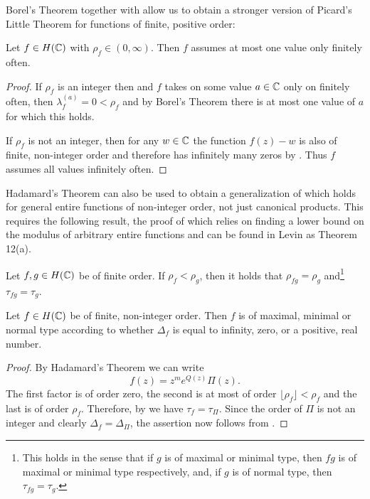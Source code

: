Borel's Theorem together with  allow us to obtain a stronger version of Picard's Little Theorem for functions of finite, positive order:

\begin{corollary}
    Let $f \in H(\mathbb{C})$ with $\rho_f \in (0, \infty)$. Then $f$ assumes at most one value only finitely often.
\end{corollary}

\begin{proof}
    If $\rho_f$ is an integer then and $f$ takes on some value $a \in \mathbb{C}$ only on finitely often, then $\lambda_f^{(a)} = 0 < \rho_f$ and by Borel's Theorem there is at most one value of $a$ for which this holds.

    If $\rho_f$ is not an integer, then for any $w \in \mathbb{C}$ the function $f(z) - w$ is also of finite, non-integer order and therefore has infinitely many zeros by . Thus $f$ assumes all values infinitely often.
\end{proof}

Hadamard's Theorem can also be used to obtain a generalization of  which holds for general entire functions of non-integer order, not just canonical products. This requires the following result, the proof of which relies on finding a lower bound on the modulus of arbitrary entire functions and can be found in Levin \cite{levin-distribution-of-zeros} as Theorem 12(a).

\begin{proposition} \label{prop:order-type-product-equality}
    Let $f, g \in H(\mathbb{C})$ be of finite order. If $\rho_f < \rho_g$, then it holds that $ \rho_{fg} = \rho_g $ and\footnote{This holds in the sense that if $g$ is of maximal or minimal type, then $fg$ is of maximal or minimal type respectively, and, if $g$ is of normal type, then $\tau_{fg} = \tau_g$.} $\tau_{fg} = \tau_g$.
\end{proposition}

\begin{theorem} \label{thm:entire-function-type-density}
    Let $f \in H(\mathbb{C})$ be of finite, non-integer order. Then $f$ is of maximal, minimal or normal type according to whether $\Delta_f$ is equal to infinity, zero, or a positive, real number.
\end{theorem}

\begin{proof}
    By Hadamard's Theorem we can write
    $$ f(z) = z^m e^{Q(z)} \Pi(z). $$
    The first factor is of order zero, the second is at most of order $\lfloor \rho_f \rfloor < \rho_f$ and the last is of order $\rho_f$. Therefore, by  we have  $\tau_f = \tau_\Pi$. Since the order of $\Pi$ is not an integer and clearly $\Delta_f = \Delta_\Pi$, the assertion now follows from .
\end{proof}

